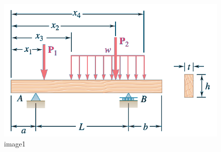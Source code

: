 \documentclass[11pt]{article}
\begin{document}
    \begin{figure}
\centering
\includegraphics{problem1MoMBending.png}
\caption{image1}
\end{figure}
\end{document}
